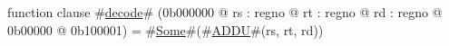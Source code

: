 function clause #\hyperref[zdecode]{decode}# (0b000000 @ rs : regno @ rt : regno @ rd : regno @ 0b00000 @ 0b100001) =
  #\hyperref[zSome]{Some}#(#\hyperref[zADDU]{ADDU}#(rs, rt, rd))
